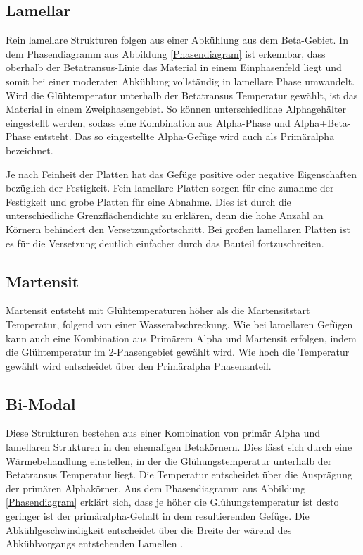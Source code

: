 \documentclass[a4paper, 11pt]{tubsreprt}
\begin{document}
\subsection{Lamellar}
Rein lamellare Strukturen folgen aus einer Abkühlung aus dem Beta-Gebiet. In dem Phasendiagramm aus Abbildung \ref{Phasendiagram} ist erkennbar, dass oberhalb der Betatransus-Linie das Material in einem Einphasenfeld liegt und somit bei einer moderaten Abkühlung vollständig in lamellare Phase umwandelt. Wird die Glühtemperatur unterhalb der Betatransus Temperatur gewählt, ist das Material in einem Zweiphasengebiet. So können unterschiedliche Alphagehälter eingestellt werden, sodass eine Kombination aus Alpha-Phase und Alpha+Beta-Phase entsteht. Das so eingestellte Alpha-Gefüge wird auch als Primäralpha bezeichnet. 


Je nach Feinheit der Platten hat das Gefüge positive oder negative Eigenschaften bezüglich der Festigkeit. Fein lamellare Platten sorgen für eine zunahme der Festigkeit und grobe Platten für eine Abnahme. Dies ist durch die unterschiedliche Grenzflächendichte zu erklären, denn die hohe Anzahl an Körnern behindert den Versetzungsfortschritt. Bei großen lamellaren Platten ist es für die Versetzung deutlich einfacher durch das Bauteil fortzuschreiten. 

\subsection{Martensit}
Martensit entsteht mit Glühtemperaturen höher als die Martensitstart Temperatur, folgend von einer Wasserabschreckung. Wie bei lamellaren Gefügen kann auch eine Kombination aus Primärem Alpha und Martensit erfolgen, indem die Glühtemperatur im 2-Phasengebiet gewählt wird. Wie hoch die Temperatur gewählt wird entscheidet über den Primäralpha Phasenanteil.

\subsection{Bi-Modal}
Diese Strukturen bestehen aus einer Kombination von primär Alpha und lamellaren Strukturen in den ehemaligen Betakörnern. Dies lässt sich durch eine Wärmebehandlung einstellen, in der die Glühungstemperatur unterhalb der Betatransus Temperatur liegt. Die Temperatur entscheidet über die Ausprägung der primären Alphakörner. Aus dem Phasendiagramm aus Abbildung \ref{Phasendiagram} erklärt sich, dass je höher die Glühungstemperatur ist desto geringer ist der primäralpha-Gehalt in dem resultierenden Gefüge. Die Abkühlgeschwindigkeit entscheidet über die Breite der wärend des Abkühlvorgangs entstehenden Lamellen \cite{Luetjering2007}.
\end{document}
